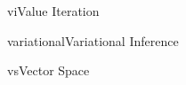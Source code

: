\documentclass[9pt]{article}
\begin{document}
\begin{topic}{vi}{Value Iteration} 
\Working
\end{topic}

\begin{topic}{variational}{Variational Inference}
\Working
\end{topic}

\begin{topic}{vs}{Vector Space}
\Working
\end{topic}


\end{document}
